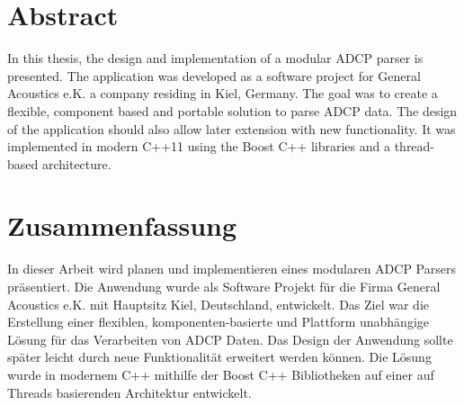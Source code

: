 \chapter*{Abstract}
In this thesis, the design and implementation of a modular ADCP parser is presented. The application was developed as a software project for General Acoustics e.K. a company residing in Kiel, Germany. The goal was to create a flexible, component based and portable solution to parse ADCP data. The design of the application should also allow later extension with new functionality. It was implemented in modern C++11 using the Boost C++ libraries and a thread-based architecture.
\chapter*{Zusammenfassung}
In dieser Arbeit wird planen und implementieren eines modularen ADCP Parsers präsentiert. Die Anwendung wurde als Software Projekt für die Firma General Acoustics e.K. mit Hauptsitz Kiel, Deutschland, entwickelt. Das Ziel war die Erstellung einer flexiblen, komponenten-basierte und Plattform unabhängige Lösung für das Verarbeiten von ADCP Daten. Das Design der Anwendung sollte später leicht durch neue Funktionalität erweitert werden können. Die Lösung wurde in modernem C++ mithilfe der Boost C++ Bibliotheken auf einer auf Threads basierenden Architektur entwickelt.


